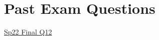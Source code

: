 \documentclass{exam}
\begin{document}

\section{Past Exam Questions}
\begin{outline}[enumerate]
    \1 \href{https://cs61a.org/exam/sp22/final/61a-sp22-final.pdf#page=25}{Sp22 Final Q12}
\end{outline}

\end{document}
